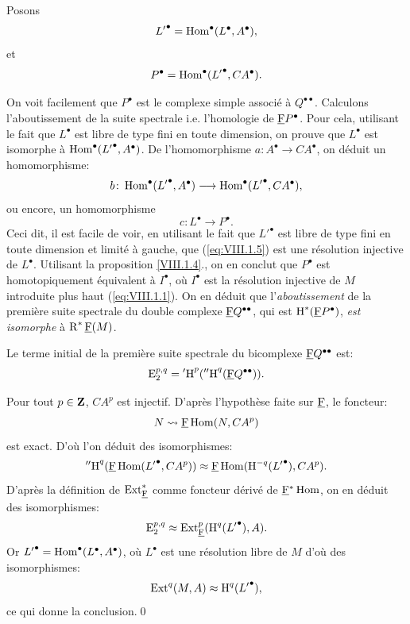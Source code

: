 Posons
\begin{equation} \label{eq:VIII.1.3} {L'}^\bullet=\operatorname{Hom}^\bullet(L^\bullet, A^\bullet),
\end{equation}
et
\begin{equation} \label{eq:VIII.1.4} P^\bullet=\operatorname{Hom}^\bullet({L'}^\bullet, CA^\bullet).
\end{equation}

On voit facilement que $P^\bullet$ est le complexe simple associ\'e \`a $Q^{\bullet\bullet}$. Calculons l'aboutissement de la suite spectrale i.e. l'homologie de ${\underline{\mathrm{F}}}P^\bullet$. Pour cela, utilisant le fait que $L^\bullet$ est libre de type fini en toute dimension, on prouve que $L^\bullet$ est isomorphe \`a $\operatorname{Hom}^\bullet({L'}^\bullet, A^\bullet)$. De l'homomorphisme $a\colon A^\bullet\to CA^\bullet$, on d\'eduit un homomorphisme:
\[b\colon \Hom^\bullet({L'}^\bullet, A^\bullet)\to \Hom^\bullet({L'}^\bullet, CA^\bullet), \]
ou encore, un homomorphisme
\begin{equation} \label{eq:VIII.1.5} c\colon L^\bullet\to P^\bullet.
\end{equation}
Ceci dit, il est facile de voir, en utilisant le fait que ${L'}^\bullet$ est libre de type fini en toute dimension et limit\'e \`a gauche, que (\ref{eq:VIII.1.5}) est une r\'esolution injective de $L^\bullet$. Utilisant la proposition \ref{VIII.1.4}., on en conclut que $P^\bullet$ est homotopiquement \'equivalent \`a $I^\bullet$, o\`u $I^\bullet$ est la r\'esolution injective de $M$ introduite plus haut (\ref{eq:VIII.1.1}). On en d\'eduit que l'\emph{aboutissement} de la premi\`ere suite spectrale du double complexe ${\underline{\mathrm{F}}}Q^{\bullet\bullet}$, qui est $\operatorname{H}^\ast({\underline{\mathrm{F}}}P^\bullet)$, \emph{est isomorphe} \`a $\operatorname{R}^\ast {\underline{\mathrm{F}}}(M)$.

Le terme initial de la premi\`ere suite spectrale du bicomplexe ${\underline{\mathrm{F}}}Q^{\bullet\bullet}$ est:
\[
\operatorname{E}^{p, q}_2 = {'\!\operatorname{H}}^p({''\!\operatorname{H}}^q({\underline{\mathrm{F}}}Q^{\bullet\bullet})).
\]

Pour tout $p\in\mathbf{Z}$, $CA^p$ est injectif. D'apr\`es l'hypoth\`ese faite sur ${\underline{\mathrm{F}}}$, le foncteur:
\[
N \rightsquigarrow {\underline{\mathrm{F}}}\operatorname{Hom}(N, CA^p)\]
est exact. D'o\`u l'on d\'eduit des isomorphismes:
\[
{''\!\operatorname{H}}^q({\underline{\mathrm{F}}}\operatorname{Hom}({L'}^\bullet, CA^p))\approx {\underline{\mathrm{F}}}\operatorname{Hom}(\operatorname{H}^{-q}({L'}^\bullet), CA^p).
\]
D'apr\`es la d\'efinition de $\operatorname{Ext}^\ast_{{\underline{\mathrm{F}}}}$ comme foncteur d\'eriv\'e de ${\underline{\mathrm{F}}}{^\ast}\operatorname{Hom}$, on en d\'eduit des isomorphismes:
\[
\operatorname{E}^{p, q}_2 \approx \operatorname{Ext}^p_{{\underline{\mathrm{F}}}}(\operatorname{H}^q({L'}^\bullet), A).
\]
Or ${L'}^\bullet=\operatorname{Hom}^\bullet(L^\bullet, A^\bullet)$, o\`u $L^\bullet$ est une r\'esolution libre de $M$ d'o\`u des isomorphismes:
\[
\operatorname{Ext}^{q}(M, A)\approx \operatorname{H}^q({L'}^\bullet),
\]
ce qui donne la conclusion.\qed

